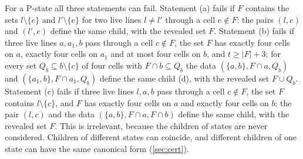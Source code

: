 For a \VOID{} P-state all three statements can fail. Statement (a) fails if $F$ contains the sets
$l\setminus\{e\}$ and $l'\setminus\{e\}$ for two live lines $l\ne l'$ through a cell $e\notin F$: the pairs
$(l,e)$ and $(l',e)$ define the same child, with the revealed set $F$. Statement (b) fails if three live
lines $a,a_1,b$ pass through a cell $c\notin F$, the set $F$ has exactly four cells on $a$, exactly four
cells on $a_1$ and at most four cells on $b$, and $t\ge|F|+3$: for every set $Q_b\subseteq b\setminus\{c\}$
of four cells with $F\cap b\subseteq Q_b$ the data $(\{a,b\},F\cap a,Q_b)$ and $(\{a_1,b\},F\cap a_1,Q_b)$
define the same child \textup{(d)}, with the revealed set $F\cup Q_b$. Statement (c) fails if three live lines $l,a,b$
pass through a cell $c\notin F$, the set $F$ contains $l\setminus\{c\}$, and $F$ has exactly four cells on
$a$ and exactly four cells on $b$: the pair $(l,c)$ and the data $(\{a,b\},F\cap a,F\cap b)$ define the same
child, with the revealed set $F$. This is irrelevant, because the children of \VOID{} states are never
considered. Children of different states can coincide, and
different children of one state can have the same canonical form (\cref{sec:cert}).

